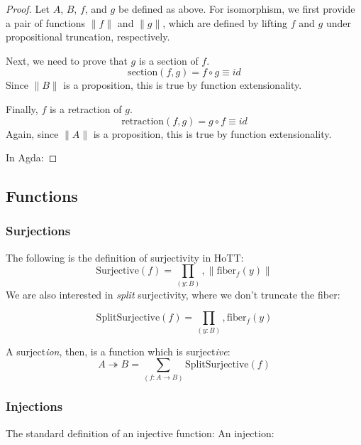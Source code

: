 \begin{subappendices}
\begin{proof}
  Let \(A\), \(B\), \(f\), and \(g\) be defined as above.
  For isomorphism, we first provide a pair of functions \(\lVert f \rVert\) and
  \(\lVert g \rVert\), which are defined by lifting \(f\) and \(g\) under
  propositional truncation, respectively.

  Next, we need to prove that \(g\) is a section of \(f\).
  \begin{equation}
    \text{section}(f, g) = f \circ g \equiv id
  \end{equation}
  Since \(\lVert B \rVert\) is a proposition, this is true by function
  extensionality.

  Finally, \(f\) is a retraction of \(g\).
  \begin{equation}
    \text{retraction}(f, g) = g \circ f \equiv id
  \end{equation}
  Again, since \(\lVert A \rVert\) is a proposition, this is true by function
  extensionality.
  
  In Agda:
\end{proof}
\subsection{Functions}
\subsubsection{Surjections}
The following is the definition of surjectivity in HoTT:
\begin{equation}
  \text{Surjective}(f) = \prod_{(y : B)} , \lVert \text{fiber}_f(y) \rVert
\end{equation}
We are also interested in \emph{split} surjectivity, where we don't truncate the
fiber:

\begin{equation}
  \text{SplitSurjective}(f) = \prod_{(y : B)} , \text{fiber}_f(y)
\end{equation}

A surject\emph{ion}, then, is a function which is surject\emph{ive}:
\begin{equation}
  A \twoheadrightarrow B = \sum_{(f : A \rightarrow B)} \text{SplitSurjective}(f)
\end{equation}
\subsubsection{Injections}
The standard definition of an injective function:
An injection:

\end{subappendices}
